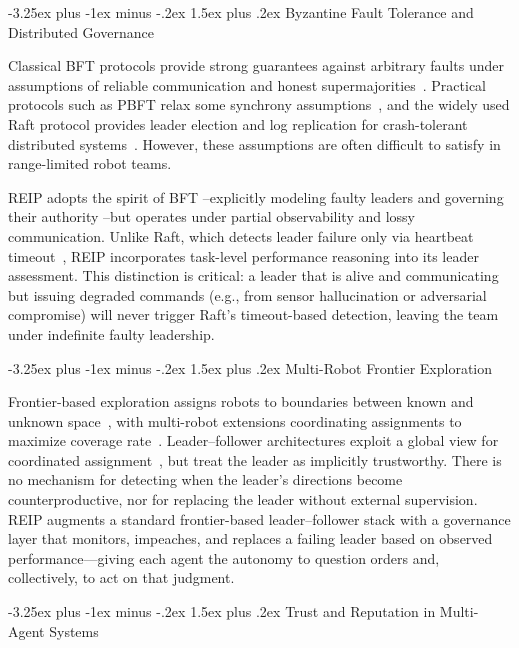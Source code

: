 \documentclass[conference]{IEEEtran}
\makeatletter
\renewcommand{\subsection}{\@startsection{subsection}{2}{\z@}%
  {-3.25ex plus -1ex minus -.2ex}%
  {1.5ex plus .2ex}%
  {\normalfont\normalsize\itshape\centering}}
\makeatother
\begin{document}
\subsection{Byzantine Fault Tolerance and Distributed Governance}

Classical BFT protocols provide strong guarantees against arbitrary faults under assumptions of reliable communication and honest supermajorities~\cite{lamport1982byzantine}. Practical protocols such as PBFT relax some synchrony assumptions~\cite{castro1999practical}, and the widely used Raft protocol provides leader election and log replication for crash-tolerant distributed systems~\cite{ongaro2014raft}. However, these assumptions are often difficult to satisfy in range-limited robot teams.

REIP adopts the spirit of BFT --explicitly modeling faulty leaders and governing their authority --but operates under partial observability and lossy communication. Unlike Raft, which detects leader failure only via heartbeat timeout~\cite{ongaro2014raft}, REIP incorporates task-level performance reasoning into its leader assessment. This distinction is critical: a leader that is alive and communicating but issuing degraded commands (e.g., from sensor hallucination or adversarial compromise) will never trigger Raft's timeout-based detection, leaving the team under indefinite faulty leadership.

\subsection{Multi-Robot Frontier Exploration}

Frontier-based exploration assigns robots to boundaries between known and unknown space~\cite{yamauchi1997frontier}, with multi-robot extensions coordinating assignments to maximize coverage rate~\cite{burgard2000collaborative}. Leader--follower architectures exploit a global view for coordinated assignment~\cite{simmons2000coordination}, but treat the leader as implicitly trustworthy. There is no mechanism for detecting when the leader's directions become counterproductive, nor for replacing the leader without external supervision. REIP augments a standard frontier-based leader--follower stack with a governance layer that monitors, impeaches, and replaces a failing leader based on observed performance---giving each agent the autonomy to question orders and, collectively, to act on that judgment.

\subsection{Trust and Reputation in Multi-Agent Systems}
\end{document}
